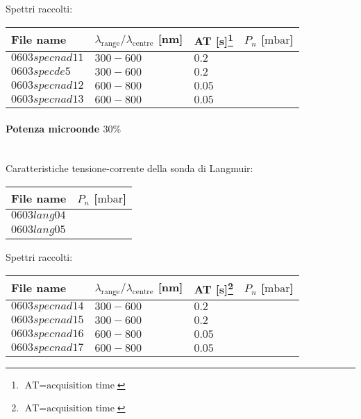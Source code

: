Spettri raccolti:
\begin{center}
\begin{tabular}{p{3cm}p{4cm}p{2cm}p{3cm}}
\toprule
File name	&$\lambda_\text{range}\text{/}\lambda_\text{centre}$ [nm] &AT [s]\footnote{$\text{AT}=\text{acquisition time}$} &$P_{n}$ [$\si{\milli\bar}$]\\
\midrule
$0603specnad11$	&$300-600$	&$0.2$		&$  $\\
$0603specde5$	&$300-600$	&$0.2$		&$  $\\
$0603specnad12$	&$600-800$	&$0.05$		&$  $\\
$0603specnad13$	&$600-800$	&$0.05$		&$  $\\

\bottomrule
\end{tabular}
\end{center}

\paragraph*{Potenza microonde $\text{30\%}$} ~\\
Caratteristiche tensione-corrente della sonda di Langmuir:
\begin{center}
  \begin{tabular}{p{3cm}p{3cm}}
  \toprule
File name	&$P_{n}$ [$\si{\milli\bar}$]\\
  \midrule
$0603lang04$	&$  $\\
$0603lang05$	&$  $\\

  \bottomrule
  \end{tabular}
\end{center}

Spettri raccolti:
\begin{center}
\begin{tabular}{p{3cm}p{4cm}p{2cm}p{3cm}}
\toprule
File name	&$\lambda_\text{range}\text{/}\lambda_\text{centre}$ [nm] &AT [s]\footnote{$\text{AT}=\text{acquisition time}$} &$P_{n}$ [$\si{\milli\bar}$]\\
\midrule
$0603specnad14$	&$300-600$	&$0.2$		&$  $\\
$0603specnad15$	&$300-600$	&$0.2$		&$  $\\
$0603specnad16$	&$600-800$	&$0.05$		&$  $\\
$0603specnad17$	&$600-800$	&$0.05$		&$  $\\


\bottomrule
\end{tabular}
\end{center}

